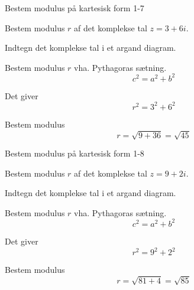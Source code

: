 \documentclass{article}
\begin{document}
\newpage

\begin{exercise}{Bestem modulus på kartesisk form 1-7}
	
	Bestem modulus $r$ af det komplekse tal $z=3+6i$.
	
	
	
	\hint 
	
	Indtegn det komplekse tal i et argand diagram.
	
	
	\hint
	
	Bestem modulus $r$ vha. Pythagoras sætning.
	\[
	c^2 = a^2 + b^2
	\]
	
	\hint 
	
	Det giver
	\[
	r^2 = 3^2 + 6^2
	\]
	
	\hint
	
	Bestem modulus
	\[
	r  = \sqrt{9+36} = \sqrt{45} 
	\]
	
	
	
\end{exercise}


\newpage

\begin{exercise}{Bestem modulus på kartesisk form 1-8}
	
	Bestem modulus $r$ af det komplekse tal $z=9+2i$.
	
	
	
	\hint 
	
	Indtegn det komplekse tal i et argand diagram.
	
	
	\hint
	
	Bestem modulus $r$ vha. Pythagoras sætning.
	\[
	c^2 = a^2 + b^2
	\]
	
	\hint 
	
	Det giver
	\[
	r^2 = 9^2 + 2^2
	\]
	
	\hint
	
	Bestem modulus
	\[
	r  = \sqrt{81+4} = \sqrt{85} 
	\]
	
	
	
\end{exercise}
\end{document}
